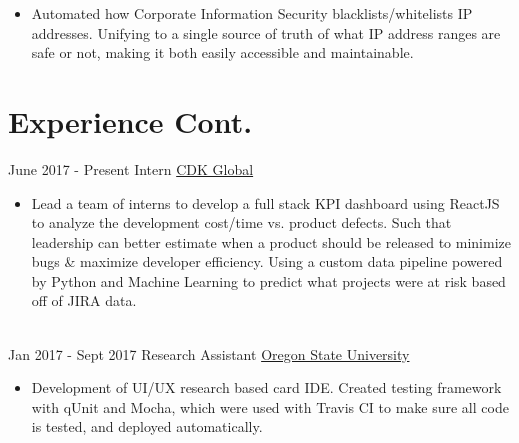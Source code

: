 \documentclass[letterpaper]{twentysecondcv} %
\begin{document}
\begin{twenty}
{\begin{itemize}
                \item Automated how Corporate Information Security blacklists/whitelists IP addresses. Unifying to a single source of truth of what IP address ranges are safe or not, making it both easily accessible and maintainable. 
            
            \end{itemize}
            }
    \end{twenty}
    \newpage
    
    \makeprofile
    
    \section{Experience Cont.}
    \begin{twenty}
        \twentyitem
        	{June 2017 -}
    		{Present}
            {Intern}
            {\href{https://www.cdkglobal.com/}{CDK Global}}
            {}
            {
            \begin{itemize}
                \item Lead a team of interns to develop a full stack KPI dashboard using ReactJS to analyze the development cost/time vs. product defects. Such that leadership can better estimate when a product should be released to minimize bugs \& maximize developer efficiency. Using a custom data pipeline powered by Python and Machine Learning to predict what projects were at risk based off of JIRA data. 
            \end{itemize}
            }
            \\
    	\twentyitem
        	{Jan 2017 -}
    		{Sept 2017}
            {Research Assistant}
            {\href{http://www.oregonstate.edu}{Oregon State University}}
            {}
            {
            \begin{itemize}
                \item Development of UI/UX research based card IDE. Created testing framework with qUnit and Mocha, which were used with Travis CI to make sure all code is tested, and deployed automatically. 
            \end{itemize}
            	}
	\end{twenty}
    
\end{document}
